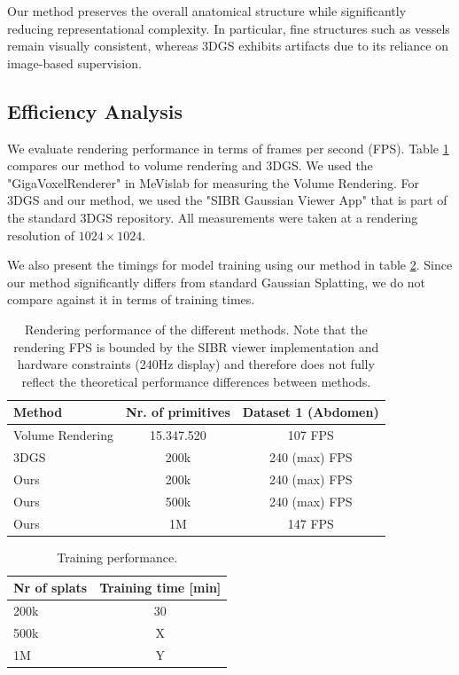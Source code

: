 \documentclass[runningheads]{llncs}
\begin{document}
Our method preserves the overall anatomical structure while significantly reducing representational complexity. In particular, fine structures such as vessels remain visually consistent, whereas 3DGS exhibits artifacts due to its reliance on image-based supervision.

\subsection{Efficiency Analysis}
We evaluate rendering performance in terms of frames per second (FPS). Table \ref{tab2} compares our method to volume rendering and 3DGS. We used the "GigaVoxelRenderer" in MeVislab for measuring the Volume Rendering. For 3DGS and our method, we used the "SIBR Gaussian Viewer App" that is part of the standard 3DGS repository. All measurements were taken at a rendering resolution of $1024 \times 1024$.

We also present the timings for model training using our method in table \ref{tab3}. Since our method significantly differs from standard Gaussian Splatting, we do not compare against it in terms of training times.

\begin{table}
\centering
\caption{Rendering performance of the different methods. Note that the rendering FPS is bounded by the SIBR viewer implementation and hardware constraints (240Hz display) and therefore does not fully reflect the theoretical performance differences between methods.}\label{tab2}
\begin{tabular}{|l|c|c|}
\hline
Method & Nr. of primitives & Dataset 1 (Abdomen)\\
\hline
Volume Rendering & 15.347.520 & 107 FPS\\
3DGS & 200k & 240 (max) FPS \\
Ours & 200k & 240 (max) FPS \\
Ours & 500k & 240 (max) FPS \\
Ours & 1M & 147 FPS \\
\hline
\end{tabular}
\end{table}

\begin{table}
\centering
\caption{Training performance.}\label{tab3}
\begin{tabular}{|l|c|}
\hline
Nr of splats & Training time [min]\\
\hline
200k & 30 \\
500k & X \\
1M & Y \\
\hline
\end{tabular}
\end{table}
\end{document}
